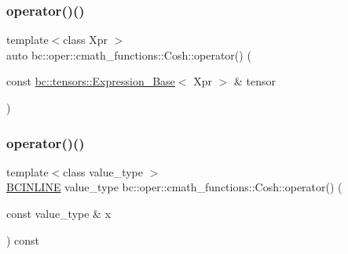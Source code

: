 \mbox{\label{structbc_1_1oper_1_1cmath__functions_1_1Cosh_ad4b0090c0b5ca522f98d84bac682e9c1}} 
\subsubsection{\texorpdfstring{operator()()}{operator()()}\hspace{0.1cm}{\footnotesize\ttfamily [2/3]}}
{\footnotesize\ttfamily template$<$class Xpr $>$ \\
auto bc\+::oper\+::cmath\+\_\+functions\+::\+Cosh\+::operator() (\begin{DoxyParamCaption}\item[{const \hyperlink{classbc_1_1tensors_1_1Expression__Base}{bc\+::tensors\+::\+Expression\+\_\+\+Base}$<$ Xpr $>$ \&}]{tensor }\end{DoxyParamCaption})\hspace{0.3cm}{\ttfamily [inline]}}

\mbox{\label{structbc_1_1oper_1_1cmath__functions_1_1Cosh_a19d08ca6266658ed8d966d1821e2805a}} 
\subsubsection{\texorpdfstring{operator()()}{operator()()}\hspace{0.1cm}{\footnotesize\ttfamily [3/3]}}
{\footnotesize\ttfamily template$<$class value\+\_\+type $>$ \\
\hyperlink{common_8h_a6699e8b0449da5c0fafb878e59c1d4b1}{B\+C\+I\+N\+L\+I\+NE} value\+\_\+type bc\+::oper\+::cmath\+\_\+functions\+::\+Cosh\+::operator() (\begin{DoxyParamCaption}\item[{const value\+\_\+type \&}]{x }\end{DoxyParamCaption}) const\hspace{0.3cm}{\ttfamily [inline]}}



